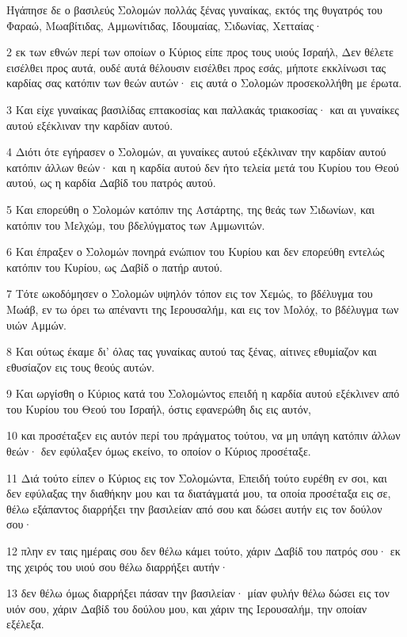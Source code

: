 \par Ηγάπησε δε ο βασιλεύς Σολομών πολλάς ξένας γυναίκας, εκτός της θυγατρός του Φαραώ, Μωαβίτιδας, Αμμωνίτιδας, Ιδουμαίας, Σιδωνίας, Χετταίας·
\par 2 εκ των εθνών περί των οποίων ο Κύριος είπε προς τους υιούς Ισραήλ, Δεν θέλετε εισέλθει προς αυτά, ουδέ αυτά θέλουσιν εισέλθει προς εσάς, μήποτε εκκλίνωσι τας καρδίας σας κατόπιν των θεών αυτών· εις αυτά ο Σολομών προσεκολλήθη με έρωτα.
\par 3 Και είχε γυναίκας βασιλίδας επτακοσίας και παλλακάς τριακοσίας· και αι γυναίκες αυτού εξέκλιναν την καρδίαν αυτού.
\par 4 Διότι ότε εγήρασεν ο Σολομών, αι γυναίκες αυτού εξέκλιναν την καρδίαν αυτού κατόπιν άλλων θεών· και η καρδία αυτού δεν ήτο τελεία μετά του Κυρίου του Θεού αυτού, ως η καρδία Δαβίδ του πατρός αυτού.
\par 5 Και επορεύθη ο Σολομών κατόπιν της Αστάρτης, της θεάς των Σιδωνίων, και κατόπιν του Μελχώμ, του βδελύγματος των Αμμωνιτών.
\par 6 Και έπραξεν ο Σολομών πονηρά ενώπιον του Κυρίου και δεν επορεύθη εντελώς κατόπιν του Κυρίου, ως Δαβίδ ο πατήρ αυτού.
\par 7 Τότε ωκοδόμησεν ο Σολομών υψηλόν τόπον εις τον Χεμώς, το βδέλυγμα του Μωάβ, εν τω όρει τω απέναντι της Ιερουσαλήμ, και εις τον Μολόχ, το βδέλυγμα των υιών Αμμών.
\par 8 Και ούτως έκαμε δι' όλας τας γυναίκας αυτού τας ξένας, αίτινες εθυμίαζον και εθυσίαζον εις τους θεούς αυτών.
\par 9 Και ωργίσθη ο Κύριος κατά του Σολομώντος επειδή η καρδία αυτού εξέκλινεν από του Κυρίου του Θεού του Ισραήλ, όστις εφανερώθη δις εις αυτόν,
\par 10 και προσέταξεν εις αυτόν περί του πράγματος τούτου, να μη υπάγη κατόπιν άλλων θεών· δεν εφύλαξεν όμως εκείνο, το οποίον ο Κύριος προσέταξε.
\par 11 Διά τούτο είπεν ο Κύριος εις τον Σολομώντα, Επειδή τούτο ευρέθη εν σοι, και δεν εφύλαξας την διαθήκην μου και τα διατάγματά μου, τα οποία προσέταξα εις σε, θέλω εξάπαντος διαρρήξει την βασιλείαν από σου και δώσει αυτήν εις τον δούλον σου·
\par 12 πλην εν ταις ημέραις σου δεν θέλω κάμει τούτο, χάριν Δαβίδ του πατρός σου· εκ της χειρός του υιού σου θέλω διαρρήξει αυτήν·
\par 13 δεν θέλω όμως διαρρήξει πάσαν την βασιλείαν· μίαν φυλήν θέλω δώσει εις τον υιόν σου, χάριν Δαβίδ του δούλου μου, και χάριν της Ιερουσαλήμ, την οποίαν εξέλεξα.
